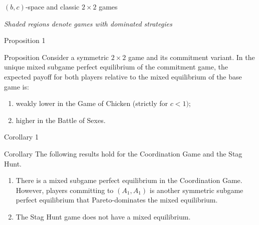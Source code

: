 \documentclass[../slides.tex]{subfiles}
\begin{document}
\begin{frame}{$(b,c)$‐space and classic $2\times2$ games}
\centering
{}
\vspace{1ex}

\scriptsize\itshape
Shaded regions denote games with dominated strategies
\end{frame}
\begin{frame}{Proposition 1}
\begin{block}{Proposition}
Consider a symmetric \(2\times2\) game and its commitment variant.  
In the unique mixed subgame perfect equilibrium of the commitment game, the expected payoff for both players relative to the mixed equilibrium of the base game is:
\begin{enumerate}
    \item weakly lower in the Game of Chicken (strictly for \(c<1)\);
    \item higher in the Battle of Sexes.
\end{enumerate}
\end{block}
\end{frame}
\begin{frame}{Corollary 1}
\begin{block}{Corollary}
The following results hold for the Coordination Game and the Stag Hunt.
\begin{enumerate}
    \item There is a mixed subgame perfect equilibrium in the Coordination Game. However, players committing to \((A_1,A_1)\) is another symmetric subgame perfect equilibrium that Pareto-dominates the mixed equilibrium.
    \item The Stag Hunt game does not have a mixed equilibrium.
\end{enumerate}
\end{block}
\end{frame}
\end{document}
